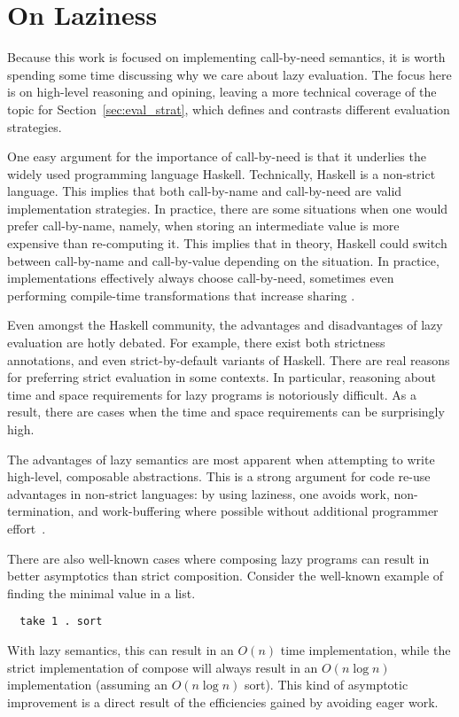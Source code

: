 \section{On Laziness}

Because this work is focused on implementing call-by-need semantics, it is worth
spending some time discussing why we care about lazy evaluation. The focus here
is on high-level reasoning and opining, leaving a more technical coverage
of the topic for Section~\ref{sec:eval_strat}, which defines and contrasts
different evaluation strategies.

One easy argument for the importance of call-by-need is that it underlies the
widely used programming language Haskell. Technically, Haskell is a non-strict
language.  This implies that both call-by-name and call-by-need are valid
implementation strategies. In practice, there are some situations when one would
prefer call-by-name, namely, when storing an intermediate value is more
expensive than re-computing it. This implies that in theory, Haskell could
switch between call-by-name and call-by-value depending on the situation.  In
practice, implementations effectively always choose call-by-need, sometimes
even performing compile-time transformations that increase sharing
\cite{jones96floating}.  

Even amongst the Haskell community, the advantages and disadvantages of
lazy evaluation are hotly debated. For example, there exist both strictness
annotations, and even strict-by-default variants of Haskell. There are real
reasons for preferring strict evaluation in some contexts. In particular,
reasoning about time and space requirements for lazy programs is notoriously
difficult. As a result, there are cases when the time and space requirements can
be surprisingly high.

The advantages of lazy semantics are most apparent when attempting to write
high-level, composable abstractions. This is a strong argument for code re-use
advantages in non-strict languages: by using laziness, one avoids work,
non-termination, and work-buffering where possible without additional programmer
effort~\cite{hughes1989functional}.

There are also well-known cases where composing lazy programs can result in
better asymptotics than strict composition. Consider the well-known example of
finding the minimal value in a list. 
\begin{verbatim}
  take 1 . sort
\end{verbatim}
With lazy semantics, this can result in an $O(n)$ time implementation, while the
strict implementation of compose will always result in an $O(n \log n)$
implementation (assuming an $O(n \log n)$ sort). This kind of asymptotic
improvement is a direct result of the efficiencies gained by avoiding eager
work. 

